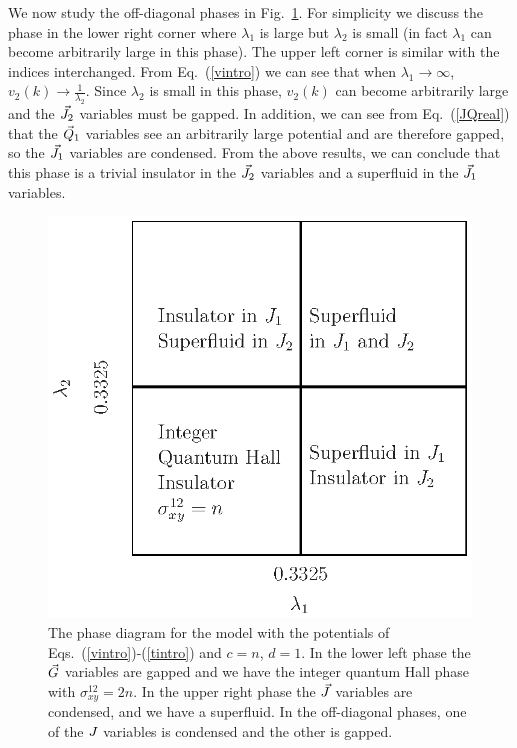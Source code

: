 We now study the off-diagonal phases in Fig.~\ref{intphase}. For simplicity we discuss the phase in the lower right corner where $\lambda_1$ is large but $\lambda_2$ is small (in fact $\lambda_1$ can become arbitrarily large in this phase). The upper left corner is similar with the indices interchanged. From Eq.~(\ref{vintro}) we can see that when $\lambda_1\rightarrow\infty$,  $v_2(k)\rightarrow\frac{1}{\lambda_2}$. Since $\lambda_2$ is small in this phase, $v_2(k)$ can become arbitrarily large and the $\vec{J}_2$ variables must be gapped. In addition, we can see from Eq.~(\ref{JQreal}) that the $\vec{Q}_1$ variables see an arbitrarily large potential and are therefore gapped, so the $\vec{J}_1$ variables are condensed. From the above results, we can conclude that this phase is a trivial insulator in the $\vec{J}_2$ variables and a superfluid in the $\vec{J}_1$ variables.

\begin{figure}
\includegraphics[width=\linewidth]{figures/intphase.eps}
\caption{The phase diagram for the model with the potentials of Eqs.~(\ref{vintro})-(\ref{tintro}) and $c=n$, $d=1$. In the lower left phase the $\vec{G}$ variables are gapped and we have the integer quantum Hall phase with $\sigma^{12}_{xy}=2n$. In the upper right phase the $\vec{J}$ variables are condensed, and we have a superfluid.  In the off-diagonal phases, one of the $J$ variables is condensed and the other is gapped.}
\label{intphase}
\end{figure}

